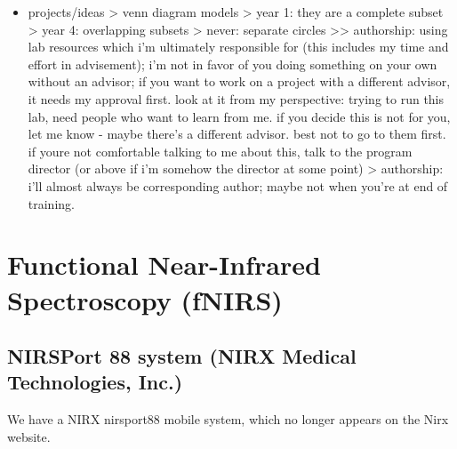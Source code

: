 \documentclass[
]{book}
\providecommand{\tightlist}{%
  \setlength{\itemsep}{0pt}\setlength{\parskip}{0pt}}
\begin{document}
\begin{itemize}
\tightlist
\item
  projects/ideas
  \textgreater{} venn diagram models
  \textgreater{} year 1: they are a complete subset
  \textgreater{} year 4: overlapping subsets
  \textgreater{} never: separate circles
  \textgreater\textgreater{} authorship: using lab resources which i'm ultimately responsible for (this includes my time and effort in advisement); i'm not in favor of you doing something on your own without an advisor; if you want to work on a project with a different advisor, it needs my approval first. look at it from my perspective: trying to run this lab, need people who want to learn from me. if you decide this is not for you, let me know - maybe there's a different advisor. best not to go to them first. if youre not comfortable talking to me about this, talk to the program director (or above if i'm somehow the director at some point)
  \textgreater{} authorship: i'll almost always be corresponding author; maybe not when you're at end of training.
\end{itemize}

\hypertarget{functional-near-infrared-spectroscopy-fnirs}{%
\chapter{Functional Near-Infrared Spectroscopy (fNIRS)}\label{functional-near-infrared-spectroscopy-fnirs}}

\hypertarget{nirsport-88-system-nirx-medical-technologies-inc.}{%
\section{NIRSPort 88 system (NIRX Medical Technologies, Inc.)}\label{nirsport-88-system-nirx-medical-technologies-inc.}}

We have a NIRX nirsport88 mobile system, which no longer appears on the Nirx website.
\end{document}

